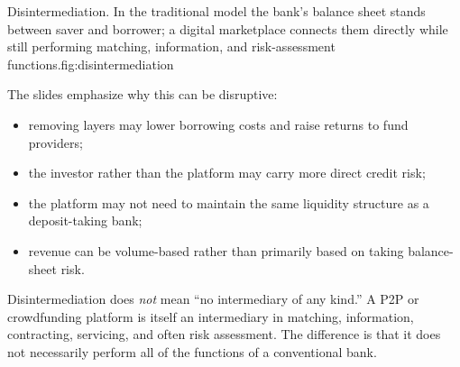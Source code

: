 \begin{utpfig}[Disintermediation]{Disintermediation. In the traditional model the bank's balance sheet stands between saver and borrower; a digital marketplace connects them directly while still performing matching, information, and risk-assessment functions.}{fig:disintermediation}
\end{utpfig}

The slides emphasize why this can be disruptive:

\begin{itemize}
  \item removing layers may lower borrowing costs and raise returns to fund providers;
  \item the investor rather than the platform may carry more direct credit risk;
  \item the platform may not need to maintain the same liquidity structure as a deposit-taking bank;
  \item revenue can be volume-based rather than primarily based on taking balance-sheet risk.
\end{itemize}

\begin{pitfall}
Disintermediation does \emph{not} mean ``no intermediary of any kind.'' A P2P or crowdfunding platform is itself an intermediary in matching, information, contracting, servicing, and often risk assessment. The difference is that it does not necessarily perform all of the functions of a conventional bank.
\end{pitfall}

